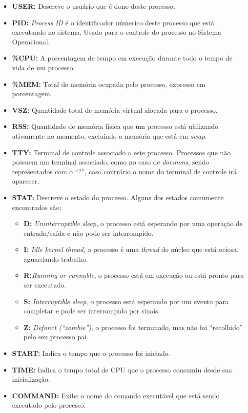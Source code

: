 \documentclass[
	12pt,				%
	oneside,   	        %
	a4paper,			%
	english,			%
	french,				%
	spanish,			%
	brazil,				%
	]{pacotes/abntex2}
\begin{document}
\begin{itemize}
    \item \textbf{USER:} Descreve o usuário que é dono deste processo.
    
    \item \textbf{PID:} \textit{Process ID} é o identificador númerico deste processo que está executando no sistema. Usado para o controle do processo no Sistema Operacional.
    \item \textbf{\%CPU:} A porcentagem de tempo em execução durante todo o tempo de vida de um processo.
    
    \item \textbf{\%MEM:} Total de memória ocupada pelo processo, expresso em porcentagem.
    
    \item \textbf{VSZ:} Quantidade total de memória virtual alocada para o processo.
    
    \item \textbf{RSS:} Quantidade de memória física que um processo está utilizando ativamente no momento, excluindo a memória que está em \textit{swap}.
    
    \item \textbf{TTY:} Terminal de controle associado a este processo. Processos que não possuem um terminal associado, como no caso de \textit{daemons}, sendo representados com o ``?'', caso contrário o nome do terminal de controle irá aparecer.
    
    \item \textbf{STAT:} Descreve o estado do processo. Alguns dos estados comumente encontrados são:
    
    \begin{itemize}
        \item \textbf{D:} \textit{Uninterruptible sleep}, o processo está esperando por uma operação de entrada/saída e não pode ser interrompido.
        \item \textbf{I:} \textit{Idle kernel thread}, o processo é uma \textit{thread} do núcleo que está ociosa, aguardando trabalho.
        \item \textbf{R:}\textit{Running or runnable}, o processo está em execução ou está pronto para ser executado.
        \item \textbf{S:} \textit{Interruptible sleep}, o processo está esperando por um evento para completar e pode ser interrompido por sinais.
        \item \textbf{Z:} \textit{Defunct (``zombie'')}, o processo foi terminado, mas não foi ``recolhido'' pelo seu processo pai.
    \end{itemize}
    
    \item \textbf{START:} Indica o tempo que o processo foi iniciado.
    
    \item \textbf{TIME:} Indica o tempo total de CPU que o processo consumiu desde sua inicialização.
    
    \item \textbf{COMMAND:} Exibe o nome do comando executável que está sendo executado pelo processo.
\end{itemize}
\end{document}
